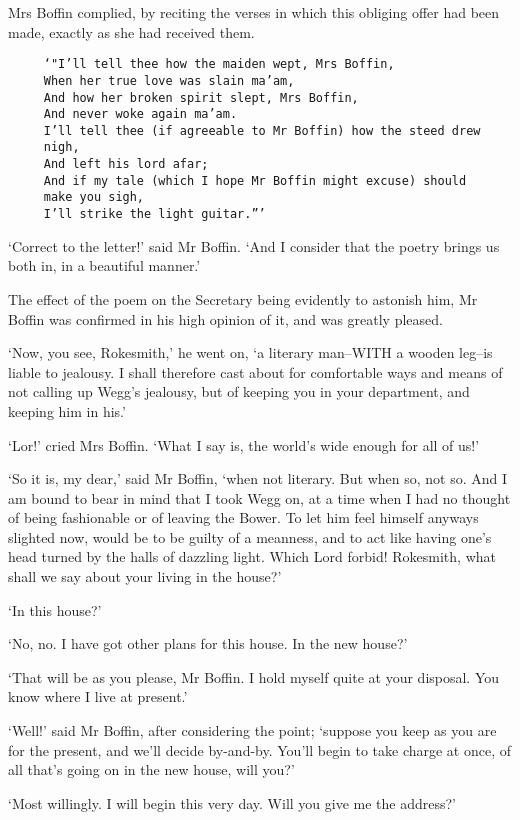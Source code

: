 Mrs Boffin complied, by reciting the verses in which this obliging offer
had been made, exactly as she had received them.

\begin{verbatim}
     ‘"I’ll tell thee how the maiden wept, Mrs Boffin,
     When her true love was slain ma’am,
     And how her broken spirit slept, Mrs Boffin,
     And never woke again ma’am.
     I’ll tell thee (if agreeable to Mr Boffin) how the steed drew
     nigh,
     And left his lord afar;
     And if my tale (which I hope Mr Boffin might excuse) should
     make you sigh,
     I’ll strike the light guitar.”’
\end{verbatim}

‘Correct to the letter!’ said Mr Boffin. ‘And I consider that the poetry
brings us both in, in a beautiful manner.’

The effect of the poem on the Secretary being evidently to astonish
him, Mr Boffin was confirmed in his high opinion of it, and was greatly
pleased.

‘Now, you see, Rokesmith,’ he went on, ‘a literary man--WITH a wooden
leg--is liable to jealousy. I shall therefore cast about for comfortable
ways and means of not calling up Wegg’s jealousy, but of keeping you in
your department, and keeping him in his.’

‘Lor!’ cried Mrs Boffin. ‘What I say is, the world’s wide enough for all
of us!’

‘So it is, my dear,’ said Mr Boffin, ‘when not literary. But when so,
not so. And I am bound to bear in mind that I took Wegg on, at a time
when I had no thought of being fashionable or of leaving the Bower. To
let him feel himself anyways slighted now, would be to be guilty of
a meanness, and to act like having one’s head turned by the halls of
dazzling light. Which Lord forbid! Rokesmith, what shall we say about
your living in the house?’

‘In this house?’

‘No, no. I have got other plans for this house. In the new house?’

‘That will be as you please, Mr Boffin. I hold myself quite at your
disposal. You know where I live at present.’

‘Well!’ said Mr Boffin, after considering the point; ‘suppose you keep
as you are for the present, and we’ll decide by-and-by. You’ll begin to
take charge at once, of all that’s going on in the new house, will you?’

‘Most willingly. I will begin this very day. Will you give me the
address?’

